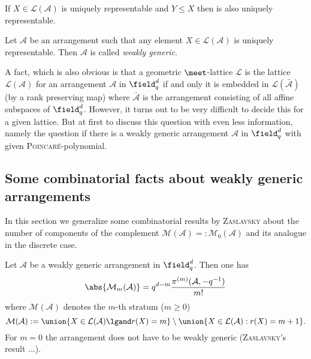 \message{ !name(OnTheRAIDProblem.tex)}\documentclass[8pt,a4paper]{article}
\begin{document}
\begin{remark}
If $X\in\mathcal{L}(\mathcal{A})$ is uniquely representable and $Y\leq X$ then is also uniquely representable. 
\end{remark}

\begin{definition}
Let $\mathcal{A}$ be an arrangement such that any element $X\in\mathcal{L}(\mathcal{A})$ is uniquely representable. Then $\mathcal{A}$ is called \emph{weakly generic}.
\end{definition}

A fact, which is also obvious is that a geometric $\meet$-lattice $\mathcal{L}$ is the lattice $\mathcal{L}(\mathcal{A})$ for an arrangement $\mathcal{A}$ in $\field_q^d$ if and only it is embedded in $\mathcal{L}(\mathcal{\bar{A}})$ (by a rank preserving map) where $\bar{\mathcal{A}}$ is the arrangement consisting of all affine subspaces of $\field_q^d$. However, it turns out to be very difficult to decide this for a given lattice.
But at first to discuss this question with even less information, namely the question if there is a weakly generic arrangement $\mathcal{A}$ in $\field_q^d$ with given \textsc{Poincaré}-polynomial.

\subsection{Some combinatorial facts about weakly generic arrangements}

In this section we generalize some combinatorial results by \textsc{Zaslavsky} about the number of components of the complement $\mathcal{M}(\mathcal{A})=:\mathcal{M}_0(\mathcal{A})$ and its analogue in the discrete case.

\begin{lemma}
Let $\mathcal{A}$ be a weakly generic arrangement in $\field_q^d$. Then one has
\begin{equation}
\abs{\mathcal{M}_m(\mathcal{A})}= q^{d-m}\frac{\pi^{(m)}(\mathcal{A},-q^{-1})}{m!}
\end{equation}
where $\mathcal{M}(\mathcal{A})$ denotes the $m$-th stratum ($m\geq 0$)
\begin{equation}
\mathcal{M}(\mathcal{A}):=\union\{X\in\mathcal{L}(\mathcal{A})\lgand r(X)=m\}\setminus\union\{X\in\mathcal{L}(\mathcal{A}):r(X)=m+1\}\text{.}
\end{equation}
For $m=0$ the arrangement does not have to be weakly generic (\textsc{Zaslavsky}'s result ...).
\end{lemma}
\end{document}
